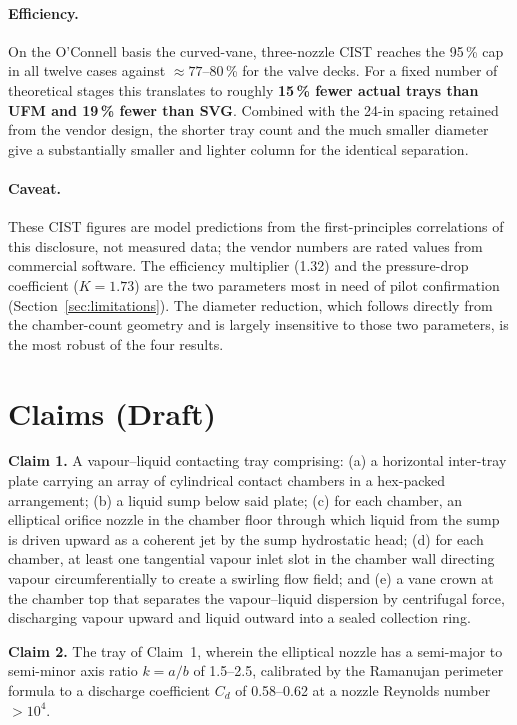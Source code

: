 \documentclass[11pt,letterpaper]{article}
\begin{document}
\paragraph{Efficiency.}  On the O'Connell basis the curved-vane,
three-nozzle CIST reaches the 95\,\% cap in all twelve cases against
$\approx 77$--80\,\% for the valve decks.  For a fixed number of
theoretical stages this translates to roughly \textbf{15\,\% fewer
actual trays than UFM and 19\,\% fewer than SVG}.  Combined with the
24-in spacing retained from the vendor design, the shorter tray count
and the much smaller diameter give a substantially smaller and lighter
column for the identical separation.

\paragraph{Caveat.}  These CIST figures are model predictions from the
first-principles correlations of this disclosure, not measured data;
the vendor numbers are rated values from commercial software.  The
efficiency multiplier (1.32) and the pressure-drop coefficient
($K = 1.73$) are the two parameters most in need of pilot confirmation
(Section~\ref{sec:limitations}).  The diameter reduction, which follows
directly from the chamber-count geometry and is largely insensitive to
those two parameters, is the most robust of the four results.

\section{Claims (Draft)}
\label{sec:claims}

\textbf{Claim 1.}
A vapour--liquid contacting tray comprising: (a) a horizontal inter-tray
plate carrying an array of cylindrical contact chambers in a hex-packed
arrangement; (b) a liquid sump below said plate; (c) for each chamber, an
elliptical orifice nozzle in the chamber floor through which liquid from
the sump is driven upward as a coherent jet by the sump hydrostatic head;
(d) for each chamber, at least one tangential vapour inlet slot in the
chamber wall directing vapour circumferentially to create a swirling flow
field; and (e) a vane crown at the chamber top that separates the
vapour--liquid dispersion by centrifugal force, discharging vapour upward
and liquid outward into a sealed collection ring.

\textbf{Claim 2.}
The tray of Claim~1, wherein the elliptical nozzle has a semi-major to
semi-minor axis ratio $k = a/b$ of 1.5--2.5, calibrated by the
Ramanujan perimeter formula to a discharge coefficient $C_d$ of 0.58--0.62
at a nozzle Reynolds number $> 10^4$.
\end{document}
